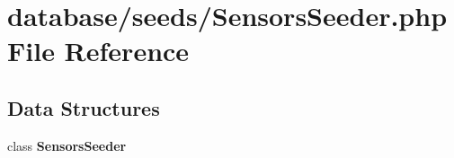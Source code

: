 \section{database/seeds/\+Sensors\+Seeder.php File Reference}
\label{_sensors_seeder_8php}
\subsection*{Data Structures}
\begin{DoxyCompactItemize}
\item 
class {\bf Sensors\+Seeder}
\end{DoxyCompactItemize}
